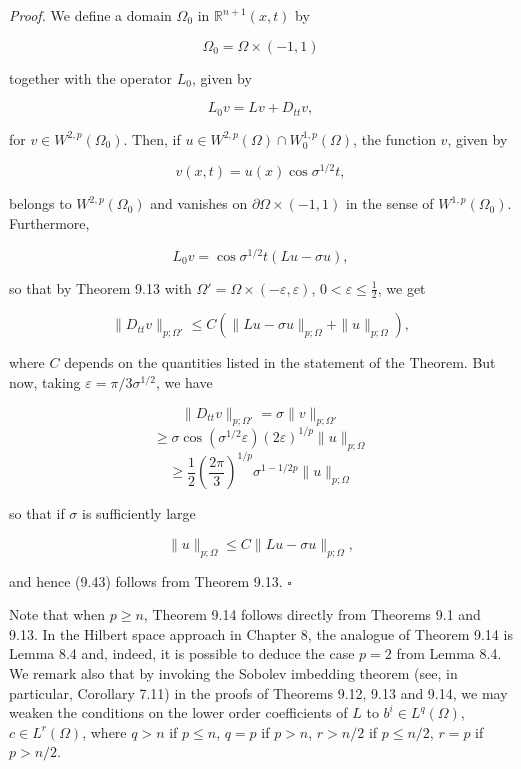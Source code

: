 \noindent \textit{Proof.} We define a domain $\Omega_0$ in $\mathbb{R}^{n+1}(x, t)$ by

\[
\Omega_0 = \Omega \times (-1,1)
\]

\noindent together with the operator $L_0$, given by

\[
L_0 v = Lv + D_{tt}v,
\]

\noindent for $v \in W^{2,p}(\Omega_0)$. Then, if $u \in W^{2,p}(\Omega) \cap W^{1,p}_0(\Omega)$, the function $v$, given by

\[
v(x,t)=u(x)\cos \sigma^{1/2}t,
\]

\noindent belongs to $W^{2,p}(\Omega_0)$ and vanishes on $\partial \Omega \times (-1,1)$ in the sense of $W^{1,p}(\Omega_0)$. Furthermore,

\[
L_0 v = \cos \sigma^{1/2}t(Lu-\sigma u),
\]

\noindent so that by Theorem 9.13 with $\Omega'=\Omega \times (-\varepsilon,\varepsilon)$, $0<\varepsilon\le \frac{1}{2}$, we get

\[
\|D_{tt}v\|_{p;\Omega'} \le C(\|Lu-\sigma u\|_{p;\Omega} + \|u\|_{p;\Omega}),
\]

\noindent where $C$ depends on the quantities listed in the statement of the Theorem. But now, taking $\varepsilon=\pi/3\sigma^{1/2}$, we have

\[
\|D_{tt}v\|_{p;\Omega'} = \sigma\|v\|_{p;\Omega'}
\]
\[
\ge \sigma \cos(\sigma^{1/2}\varepsilon)(2\varepsilon)^{1/p}\|u\|_{p;\Omega}
\]
\[
\ge \frac{1}{2}\left(\frac{2\pi}{3}\right)^{1/p}\sigma^{1-1/2p}\|u\|_{p;\Omega}
\]

\noindent so that if $\sigma$ is sufficiently large

\begin{equation}
\tag{9.44}
\|u\|_{p;\Omega} \le C\|Lu - \sigma u\|_{p;\Omega},
\end{equation}

\noindent and hence (9.43) follows from Theorem 9.13. $\square$



Note that when $p \ge n$, Theorem 9.14 follows directly from Theorems 9.1 and 9.13. In the Hilbert space approach in Chapter 8, the analogue of Theorem 9.14 is Lemma 8.4 and, indeed, it is possible to deduce the case $p=2$ from Lemma 8.4. We remark also that by invoking the Sobolev imbedding theorem (see, in particular, Corollary 7.11) in the proofs of Theorems 9.12, 9.13 and 9.14, we may weaken the conditions on the lower order coefficients of $L$ to $b^i \in L^q(\Omega)$, $c \in L^r(\Omega)$, where $q > n$ if $p \le n$, $q = p$ if $p > n$, $r > n/2$ if $p \le n/2$, $r = p$ if $p > n/2$.

